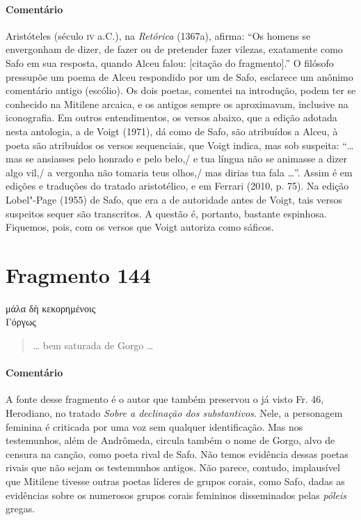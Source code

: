{{\paragraph{Comentário} Aristóteles (século \textsc{iv} a.C.), na \textit{Retórica} (1367a), afirma: ``Os homens se envergonham de dizer, de fazer ou de pretender fazer vilezas, exatamente
como Safo em sua resposta, quando Alceu falou: [citação do fragmento].''
O filósofo pressupõe um poema de Alceu respondido por um de Safo, esclarece um anônimo comentário antigo (escólio). Os
dois poetas, comentei na introdução, podem ter se conhecido na Mitilene arcaica, e
os antigos sempre os aproximavam, inclusive na iconografia.
Em outros entendimentos, os versos abaixo, que a edição adotada nesta antologia, a de Voigt (1971), dá como de Safo, são atribuídos a Alceu, à poeta são atribuídos os versos sequenciais, que Voigt indica, mas sob suspeita: ``\ldots{} mas se ansiasses pelo honrado e pelo belo,/ e tua língua não se animasse a dizer algo vil,/ a vergonha não tomaria teus olhos,/ mas dirias tua fala \ldots{}''. Assim é em edições e traduções do tratado aristotélico, e em Ferrari (2010, p. 75). Na edição Lobel"-Page (1955) de Safo, que era a de autoridade antes de Voigt, tais versos suspeitos sequer são transcritos. A questão é, portanto, bastante espinhosa. Fiquemos, pois, com os versos que Voigt autoriza como sáficos.}

\pagebreak
\section{Fragmento 144}

\begin{gkverse}
μάλα δὴ κεκορημένοις\\
Γόργως
\end{gkverse}

\begin{verse}
\ldots{} bem saturada de Gorgo \ldots{}
\end{verse}

{\paragraph{Comentário} A fonte desse fragmento é o autor que também preservou o já visto Fr. 46, Herodiano, no tratado
\textit{Sobre a declinação dos substantivos}. Nele, a personagem feminina é
criticada por uma voz sem qualquer identificação. Mas nos testemunhos, além de Andrômeda, circula também o nome de Gorgo, alvo de censura na canção, como poeta rival de Safo. Não temos evidência dessas poetas rivais que não sejam os testemunhos antigos. Não parece, contudo, implausível que Mitilene tivesse outras poetas líderes de grupos corais, como Safo, dadas as evidências sobre os numerosos  grupos corais femininos disseminados pelas \textit{póleis} gregas.}

}
